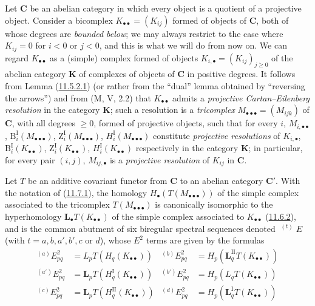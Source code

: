 \begin{env}[11.7.1]
\label{0.11.7.1}
Let $\boldsymbol{C}$ be an abelian category in which every object is a
quotient of a projective object. Consider a bicomplex
$K_{\bullet\bullet}=(K_{ij})$ formed of objects of $\boldsymbol{C}$, both of whose
degrees are \emph{bounded below}; we may always restrict to the case where
$K_{ij}=0$ for $i<0$ or $j<0$, and this is what we will do from now on. We
can regard $K_{\bullet\bullet}$ as a (simple) complex formed of
objects $K_{i,\bullet}=(K_{ij})_{j\geq 0}$ of the abelian category
$\boldsymbol{K}$ of complexes of objects of $\boldsymbol{C}$ in positive degrees. It
follows from Lemma (\hyperref[0.11.5.2.1]{11.5.2.1}) (or rather from the
``dual'' lemma obtained by ``reversing the arrows'') and from (M, V, 2.2) that
$K_{\bullet\bullet}$ admits a \emph{projective Cartan--Eilenberg
resolution} in the category $\boldsymbol{K}$; such a resolution is a
\emph{tricomplex} $M_{\bullet\bullet\bullet}=(M_{ijk})$ of $\boldsymbol{C}$, with
all degrees $\geq 0$, formed of projective objects, such that for every $i$,
$M_{i,\bullet\bullet}$, $\mathrm B_i^{\mathrm I}(M_{\bullet\bullet\bullet})$,
$\mathrm Z_i^{\mathrm I}(M_{\bullet\bullet\bullet})$,
$H_i^{\mathrm I}(M_{\bullet\bullet\bullet})$ constitute \emph{projective
resolutions} of $K_{i,\bullet}$,
$\mathrm B_i^{\mathrm I}(K_{\bullet\bullet})$,
$\mathrm Z_i^{\mathrm I}(K_{\bullet\bullet})$,
$H_i^{\mathrm I}(K_{\bullet\bullet})$ respectively in the category
$\boldsymbol{K}$; in particular, for every pair $(i,j)$,
$M_{ij,\bullet}$ is a \emph{projective resolution} of $K_{ij}$ in
$\boldsymbol{C}$.
\end{env}

\begin{proposition}[11.7.2]
\label{0.11.7.2}
Let $T$ be an additive covariant functor from $\boldsymbol{C}$ to an abelian
category $\boldsymbol{C}'$. With the notation of
\textup{(\hyperref[0.11.7.1]{11.7.1})}, {the homology
$H_\bullet(T(M_{\bullet\bullet\bullet}))$ of the simple complex associated to
the tricomplex $T(M_{\bullet\bullet\bullet})$ is canonically isomorphic to
the hyperhomology $\mathbf{L}_\bullet T(K_{\bullet\bullet})$ of the simple
complex associated to $K_{\bullet\bullet}$
\textup{(\hyperref[0.11.6.2]{11.6.2})}, and is
the common abutment of six biregular spectral sequences denoted
$\mathop{}^{(t)}E$ (with $t=a,b,a',b',c$ or $d$), whose $E^2$ terms are
given by the formulas}
\[
\begin{aligned}
{}^{(a)}E^2_{pq}&=L_pT(H_q(K_{\bullet\bullet}))&
{}^{(b)}E^2_{pq}&=H_p(\mathbf{L}_q^{\mathrm{II}}T(K_{\bullet\bullet}))\\
{}^{(a')}E^2_{pq}&=\mathbf{L}_pT(H_q^{\mathrm I}(K_{\bullet\bullet}))&
{}^{(b')}E^2_{pq}&=H_p(L_qT(K_{\bullet\bullet}))\\
{}^{(c)}E^2_{pq}&=\mathbf{L}_pT(H_q^{\mathrm{II}}(K_{\bullet\bullet}))&
{}^{(d)}E^2_{pq}&=H_p(\mathbf{L}_q^{\mathrm I}T(K_{\bullet\bullet}))
\end{aligned}
\]
\end{proposition}

